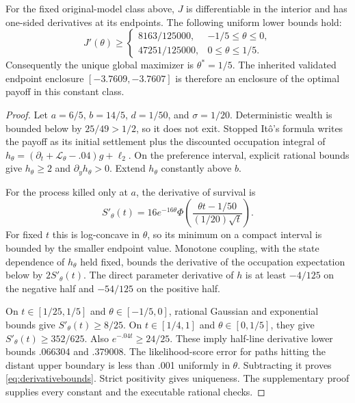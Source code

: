 \begin{theorem}\label{thm:boundary}
For the fixed original-model class above, $J$ is differentiable in the interior and has one-sided derivatives at its endpoints. The following uniform lower bounds hold:
\begin{equation}\label{eq:derivativebounds}
 J'(\theta)\ge
 \begin{cases}
 8163/125000,&-1/5\le\theta\le0,\\
 47251/125000,&0\le\theta\le1/5.
 \end{cases}
\end{equation}
Consequently the unique global maximizer is $\theta^*=1/5$. The inherited validated endpoint enclosure $[-3.7609,-3.7607]$ is therefore an enclosure of the optimal payoff in this constant class.
\end{theorem}
\begin{proof}
Let $a=6/5$, $b=14/5$, $d=1/50$, and $\sigma=1/20$. Deterministic wealth is bounded below by $25/49>1/2$, so it does not exit. Stopped It\^o's formula writes the payoff as its initial settlement plus the discounted occupation integral of $h_\theta=(\partial_t+\mathcal L_\theta-.04)g+\ell_2$. On the preference interval, explicit rational bounds give $h_\theta\ge2$ and $\partial_yh_\theta>0$. Extend $h_\theta$ constantly above $b$.

For the process killed only at $a$, the derivative of survival is
\[
 S'_\theta(t)=16e^{-16\theta}\Phi\!\left(\frac{\theta t-1/50}{(1/20)\sqrt t}\right).
\]
For fixed $t$ this is log-concave in $\theta$, so its minimum on a compact interval is bounded by the smaller endpoint value. Monotone coupling, with the state dependence of $h_\theta$ held fixed, bounds the derivative of the occupation expectation below by $2S'_\theta(t)$. The direct parameter derivative of $h$ is at least $-4/125$ on the negative half and $-54/125$ on the positive half.

On $t\in[1/25,1/5]$ and $\theta\in[-1/5,0]$, rational Gaussian and exponential bounds give $S'_\theta(t)\ge8/25$. On $t\in[1/4,1]$ and $\theta\in[0,1/5]$, they give $S'_\theta(t)\ge352/625$. Also $e^{-.04t}\ge24/25$. These imply half-line derivative lower bounds .066304 and .379008. The likelihood-score error for paths hitting the distant upper boundary is less than .001 uniformly in $\theta$. Subtracting it proves \eqref{eq:derivativebounds}. Strict positivity gives uniqueness. The supplementary proof supplies every constant and the executable rational checks.\end{proof}

